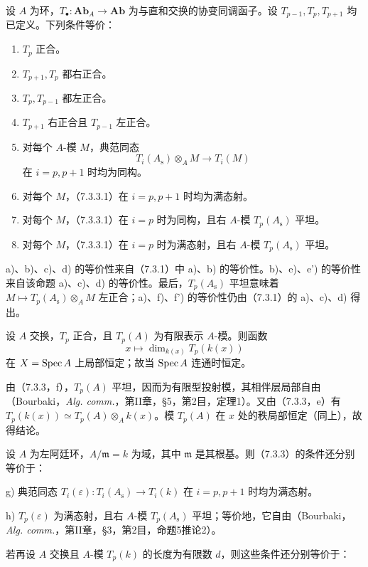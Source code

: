 设 $A$ 为环，$T_\bullet:\mathbf{Ab}_A\to\mathbf{Ab}$ 为与直和交换的协变同调函子。设 $T_{p-1},T_p,T_{p+1}$ 均已定义。下列条件等价：
\begin{enumerate}[label=\alph*)]
\item $T_p$ 正合。
\item $T_{p+1},T_p$ 都右正合。
\item $T_p,T_{p-1}$ 都左正合。
\item $T_{p+1}$ 右正合且 $T_{p-1}$ 左正合。
\item 对每个 $A$-模 $M$，典范同态
\begin{equation}
 T_i(A_{\mathrm s})\otimes_A M\longrightarrow T_i(M)\tag{7.3.3.1}
\end{equation}
在 $i=p,p+1$ 时均为同构。
\item[\textup{e')}] 对每个 $M$，（7.3.3.1）在 $i=p,p+1$ 时均为满态射。
\item[\textup{f)}] 对每个 $M$，（7.3.3.1）在 $i=p$ 时为同构，且右 $A$-模 $T_p(A_{\mathrm s})$ 平坦。
\item[\textup{f')}] 对每个 $M$，（7.3.3.1）在 $i=p$ 时为满态射，且右 $A$-模 $T_p(A_{\mathrm s})$ 平坦。
\end{enumerate}
a)、b)、c)、d) 的等价性来自（7.3.1）中 a)、b) 的等价性。b)、e)、e') 的等价性来自该命题 a)、c)、d) 的等价性。最后，$T_p(A_{\mathrm s})$ 平坦意味着 $M\mapsto T_p(A_{\mathrm s})\otimes_A M$ 左正合；a)、f)、f') 的等价性仍由（7.3.1）的 a)、c)、d) 得出。

设 $A$ 交换，$T_p$ 正合，且 $T_p(A)$ 为有限表示 $A$-模。则函数
\[
 x\longmapsto\dim_{k(x)}T_p(k(x))
\]
在 $X=\operatorname{Spec} A$ 上局部恒定；故当 $\operatorname{Spec} A$ 连通时恒定。

由（7.3.3，f），$T_p(A)$ 平坦，因而为有限型投射模，其相伴层局部自由（Bourbaki，\textit{Alg. comm.}，第II章，§5，第2目，定理1）。又由（7.3.3，e）有 $T_p(k(x))\simeq T_p(A)\otimes_A k(x)$。模 $T_p(A)$ 在 $x$ 处的秩局部恒定（同上），故得结论。

设 $A$ 为左阿廷环，$A/\mathfrak m=k$ 为域，其中 $\mathfrak m$ 是其根基。则（7.3.3）的条件还分别等价于：

\noindent g) 典范同态 $T_i(\varepsilon):T_i(A_{\mathrm s})\to T_i(k)$ 在 $i=p,p+1$ 时均为满态射。

\noindent h) $T_p(\varepsilon)$ 为满态射，且右 $A$-模 $T_p(A_{\mathrm s})$ 平坦；等价地，它自由（Bourbaki，\textit{Alg. comm.}，第II章，§3，第2目，命题5推论2）。

若再设 $A$ 交换且 $A$-模 $T_p(k)$ 的长度为有限数 $d$，则这些条件还分别等价于：

